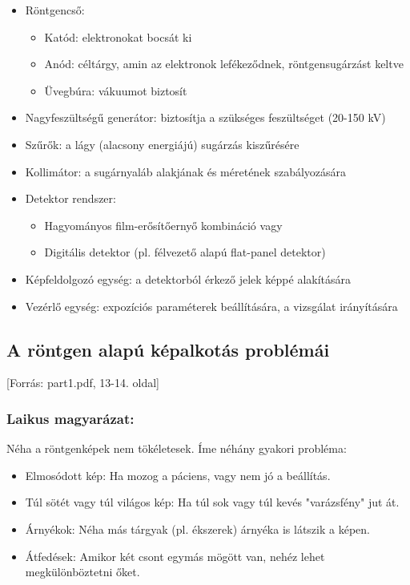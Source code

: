 \documentclass[a4paper,12pt]{article}
\begin{document}
\begin{itemize} \item Röntgencső: \begin{itemize} \item Katód: elektronokat bocsát ki \item Anód: céltárgy, amin az elektronok lefékeződnek, röntgensugárzást keltve \item Üvegbúra: vákuumot biztosít \end{itemize} \item Nagyfeszültségű generátor: biztosítja a szükséges feszültséget (20-150 kV) \item Szűrők: a lágy (alacsony energiájú) sugárzás kiszűrésére \item Kollimátor: a sugárnyaláb alakjának és méretének szabályozására \item Detektor rendszer: \begin{itemize} \item Hagyományos film-erősítőernyő kombináció vagy \item Digitális detektor (pl. félvezető alapú flat-panel detektor) \end{itemize} \item Képfeldolgozó egység: a detektorból érkező jelek képpé alakítására \item Vezérlő egység: expozíciós paraméterek beállítására, a vizsgálat irányítására \end{itemize}

\subsection{A röntgen alapú képalkotás problémái} [Forrás: part1.pdf, 13-14. oldal]

\subsubsection{Laikus magyarázat:} Néha a röntgenképek nem tökéletesek. Íme néhány gyakori probléma:

\begin{itemize} \item Elmosódott kép: Ha mozog a páciens, vagy nem jó a beállítás. \item Túl sötét vagy túl világos kép: Ha túl sok vagy túl kevés "varázsfény" jut át. \item Árnyékok: Néha más tárgyak (pl. ékszerek) árnyéka is látszik a képen. \item Átfedések: Amikor két csont egymás mögött van, nehéz lehet megkülönböztetni őket. \end{itemize}
\end{document}
